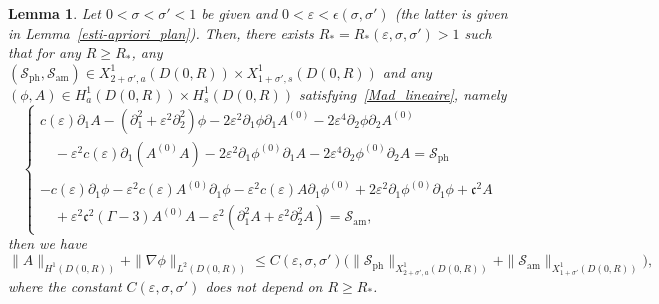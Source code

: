 \documentclass[10pt]{amsart}
\newtheorem{lemm}[theo]{Lemma}\newtheorem{prop}[theo]{Proposition}\newtheorem{coro}[theo]{Corollary}\newtheorem{conj}[theo]{Conjecture}
\theoremstyle{definition}\newtheorem{defi}[theo]{Definition}\newtheorem{rema}[theo]{Remark}\newtheorem{exam}[theo]{Example}\newtheorem{exem}[theo]{Example}\newtheorem{nota}[theo]{Notation}
\newcommand*\p{\partial}
\newcommand{\amm}{\mathrm{am}}
\newcommand{\phl}{\mathrm{ph}}
\newcommand*\BS{\mathcal{S}}
\newcommand*\cs{{\mathfrak c}}
\newcommand*\gs{\geqslant }
\newcommand*\ls{\leqslant }
\newcommand*\e{\varepsilon}
\newcommand*\ep{\epsilon}
\newcommand*\s{\sigma}
\begin{document}
\begin{lemm}\label{esti-apriori_disque}
Let $ 0 < \s < \s' < 1 $ be given and $ 0 < \e < \ep(\s, \s') $ (the latter is given in Lemma~\ref{esti-apriori_plan}). Then, there exists $ R_* = R_* (\e, \s,\s') > 1 $ such that for any $ R \gs R_* $, any $ (\BS_{\phl}, \BS_{\amm}) \in X^{1}_{2+\s', a} (D(0,R)) \times X^{1}_{1+\s', s} (D(0,R)) $ and any $ (\phi, A) \in H^{1}_{ a} (D(0,R)) \times H^{1}_{ s} (D(0,R)) $ satisfying~\eqref{Mad_lineaire}, namely
\begin{equation*}
\left\{
\begin{array}{ll}
c(\e) \p_{1} A - \left(\p_{1}^2 + \e^2 \p^2_{2}\right) \phi - 2 \e^2 \p_{1} \phi \p_{1} A^{(0)} - 2 \e^4 \p_{2} \phi \p_{2} A^{(0)}
\\
\quad - \e^2 c(\e) \p_1 (A^{(0)} A) - 2 \e^2 \p_{1} \phi^{(0)} \p_{1} A - 2 \e^4 \p_{2} \phi^{(0)} \p_{2} A = \BS_{\phl} \\ \ \\
- c(\e) \p_{1} \phi - \e^2 c(\e) A^{(0)} \p_1 \phi - \e^2 c(\e) A \p_1 \phi^{(0)} + 2 \e^2 \p_{1} \phi^{(0)} \p_{1} \phi + \cs^2 A
\\
\quad + \e^2 \cs^2 (\Gamma -3) A^{(0)} A - \e^2 \left(\p_{1}^2 A + \e^2 \p_{2}^2 A\right) = \BS_{\amm},
\end{array}\right.
\end{equation*}
then we have
\[
\| A \|_{ H^1 (D(0,R))} + \| \nabla \phi \|_{ L^2 (D(0,R))}
\ls C (\e, \s, \s')
\Big(
\| \BS_{\phl} \|_{ X^{1}_{ 2+\s', a} (D(0,R)) } + \| \BS_{\amm} \|_{ X^{ 1}_{1+\s'} (D(0,R)) }
\Big),
\]
where the constant $ C(\e, \s, \s') $ does not depend on $ R \gs R_* $.
\end{lemm}
\end{document}
